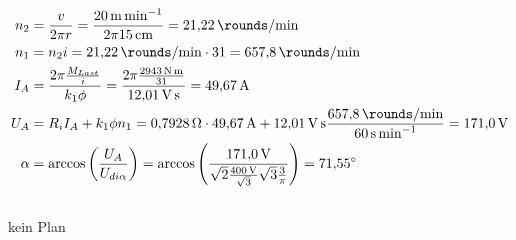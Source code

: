 \documentclass[11pt,a4paper]{scrartcl}
\newcommand{\mybr}[1]{\left(#1\right)}
\newcommand{\0}{_{\mybr{0}}}
\newcommand{\1}{_{\mybr{1}}}
\newcommand{\2}{_{\mybr{2}}}
\begin{document}
\subsection{}
\begin{align}
n_2&=\frac{v}{2\pi r}=\frac{\SI{20}{\metre\per\minute}}{2\pi\SI{15}{\centi\metre}}=\SI{21.22}{\rounds\per\minute}\\
n_1&=n_2 i =\SI{21.22}{\rounds\per\minute}\cdot 31=\SI{657.8}{\rounds\per\minute}\\
I_A&=\frac{2\pi\frac{M_{Last}}{i}}{k_1\phi}=\frac{2\pi\frac{\SI{2943}{\newton\metre}}{31}}{\SI{12.01}{\volt\second}}=\SI{49.67}{\ampere}\\
U_A&=R_i I_A+k_1\phi n_1=\SI{0.7928}{\ohm}\cdot\SI{49.67}{\ampere}+\SI{12.01}{\volt\second}\frac{\SI{657.8}{\rounds\per\minute}}{\SI{60}{\second\per\minute}}=\SI{171.0}{\volt}\\
\alpha&=\arccos\mybr{\frac{U_A}{U_{di\alpha}}}=\arccos\mybr{\frac{\SI{171.0}{\volt}}{\sqrt{2}\frac{\SI{400}{\volt}}{\sqrt{3}}\sqrt{3}\frac{3}{\pi}}}=\SI{71.55}{\degree}
\end{align}

\subsection{}
kein Plan
\end{document}
